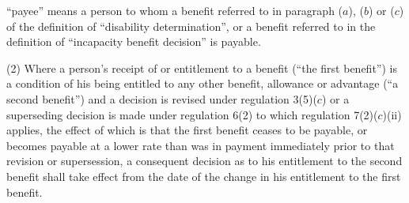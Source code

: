\documentclass[12pt,a4paper]{article}
\begin{document}
\begin{enumerate}
“payee” means a person to whom a benefit referred to in paragraph ($a$), ($b$) or ($c$) of the definition of “disability determination”, or a benefit referred to in the definition of “incapacity benefit decision” is payable.
\end{enumerate}

(2) Where a person’s receipt of or entitlement to a benefit (“the first benefit”) is a condition of his being entitled to any other benefit, allowance or advantage (“a second benefit”) and a decision is revised under regulation 3(5)($c$) or a superseding decision is made under regulation 6(2) to which regulation 7(2)($c$)(ii) applies, the effect of which is that the first benefit ceases to be payable, or becomes payable at a lower rate than was in payment immediately prior to that revision or supersession, a consequent decision as to his entitlement to the second benefit shall take effect from the date of the change in his entitlement to the first benefit.

\end{document}
